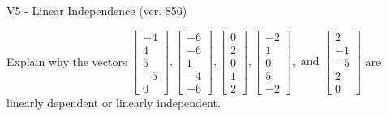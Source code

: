 \begin{exercise}
  \begin{exerciseTitle}V5 - Linear Independence (ver. 856)\end{exerciseTitle}
  \begin{exerciseStatement}
    Explain why the vectors \(\left[\begin{array}{r}
-4 \\
4 \\
5 \\
-5 \\
0
\end{array}\right] , \left[\begin{array}{r}
-6 \\
-6 \\
1 \\
-4 \\
-6
\end{array}\right] , \left[\begin{array}{r}
0 \\
2 \\
0 \\
1 \\
2
\end{array}\right] , \left[\begin{array}{r}
-2 \\
1 \\
0 \\
5 \\
-2
\end{array}\right] , \text{ and } \left[\begin{array}{r}
2 \\
-1 \\
-5 \\
2 \\
0
\end{array}\right]\) are linearly dependent or linearly independent.	



\end{exerciseStatement}
\end{exercise}
